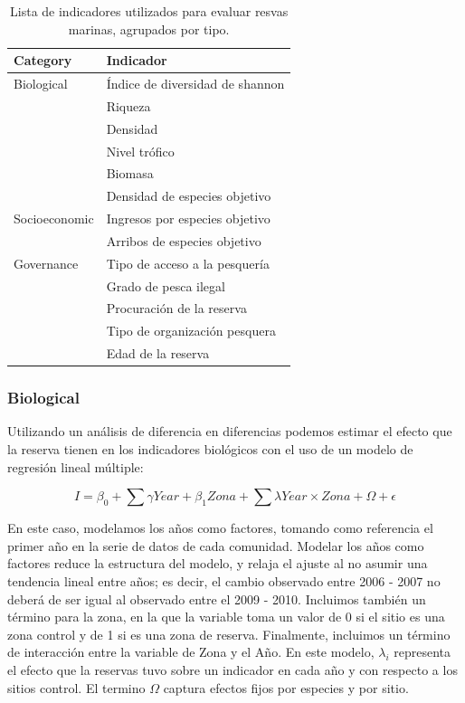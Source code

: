 \documentclass{frontiersSCNS}
\begin{document}
\begin{table}

\caption{\label{tab:unnamed-chunk-2}\label{table:indicators}Lista de indicadores utilizados para evaluar resvas marinas, agrupados por tipo.}
\centering
\begin{tabular}[t]{l|l}
\hline
Category & Indicador\\
\hline
Biological & Índice de diversidad de shannon\\
\hline
 & Riqueza\\
\hline
 & Densidad\\
\hline
 & Nivel trófico\\
\hline
 & Biomasa\\
\hline
 & Densidad de especies objetivo\\
\hline
Socioeconomic & Ingresos por especies objetivo\\
\hline
 & Arribos de especies objetivo\\
\hline
Governance & Tipo de acceso a la pesquería\\
\hline
 & Grado de pesca ilegal\\
\hline
 & Procuración de la reserva\\
\hline
 & Tipo de organización pesquera\\
\hline
 & Edad de la reserva\\
\hline
\end{tabular}
\end{table}

\subsubsection{Biological}\label{biological}

Utilizando un análisis de diferencia en diferencias podemos estimar el
efecto que la reserva tienen en los indicadores biológicos
\citep{moland_2013-VP} con el uso de un modelo de regresión lineal
múltiple:

\[I = \beta_0 + \sum \gamma Year + \beta_1 Zona + \sum \lambda Year\times Zona + \Omega + \epsilon\]

En este caso, modelamos los años como factores, tomando como referencia
el primer año en la serie de datos de cada comunidad. Modelar los años
como factores reduce la estructura del modelo, y relaja el ajuste al no
asumir una tendencia lineal entre años; es decir, el cambio observado
entre 2006 - 2007 no deberá de ser igual al observado entre el 2009 -
2010. Incluimos también un término para la zona, en la que la variable
toma un valor de 0 si el sitio es una zona control y de 1 si es una zona
de reserva. Finalmente, incluimos un término de interacción entre la
variable de Zona y el Año. En este modelo, \(\lambda_i\) representa el
efecto que la reservas tuvo sobre un indicador en cada año y con
respecto a los sitios control. El termino \(\Omega\) captura efectos
fijos por especies y por sitio.
\end{document}
